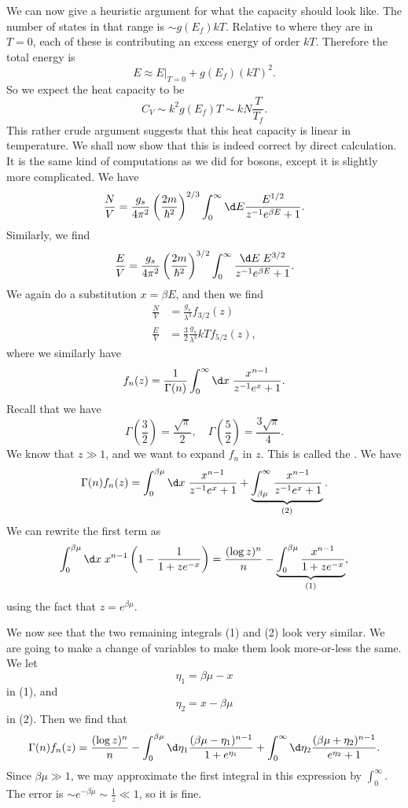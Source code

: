 \documentclass[a4paper]{article}
\begin{document}
We can now give a heuristic argument for what the capacity should look like. The number of states in that range is $\sim g(E_f) kT$. Relative to where they are in $T = 0$, each of these is contributing an excess energy of order $kT$. Therefore the total energy is
\[
  E \approx E|_{T = 0} + g(E_f) (kT)^2.
\]
So we expect the heat capacity to be
\[
  C_V \sim k^2 g(E_f) T \sim kN \frac{T}{T_f}.
\]
This rather crude argument suggests that this heat capacity is linear in temperature. We shall now show that this is indeed correct by direct calculation. It is the same kind of computations as we did for bosons, except it is slightly more complicated. We have
\[
  \frac{N}{V} = \frac{g_s}{4\pi^2}\left(\frac{2m}{\hbar^2}\right)^{2/3} \int_0^\infty \d E \frac{E^{1/2}}{z^{-1} e^{\beta E} + 1}.
\]
Similarly, we find
\[
  \frac{E}{V} = \frac{g_s}{4\pi^2} \left(\frac{2m}{\hbar^2}\right)^{3/2} \int_0^\infty \frac{\d E \; E^{3/2}}{z^{-1} e^{\beta E} + 1}.
\]
We again do a substitution $x = \beta E$, and then we find
\begin{align*}
  \frac{N}{V} &= \frac{g_s}{\lambda^3} f_{3/2}(z)\\
  \frac{E}{V} &= \frac{3}{2} \frac{g_s}{\lambda^3}kT f_{5/2}(z),
\end{align*}
where we similarly have
\[
  f_n(z) = \frac{1}{\Gamma(n)} \int_0^\infty \d x\; \frac{x^{n - 1}}{z^{-1}e^x + 1}.
\]
Recall that we have
\[
  \Gamma\left(\frac{3}{2}\right) = \frac{\sqrt{\pi}}{2},\quad \Gamma\left(\frac{5}{2}\right) = \frac{3\sqrt{\pi}}{4}.
\]
We know that $z \gg 1$, and we want to expand $f_n$ in $z$. This is called the . We have
\[
  \Gamma(n) f_n(z) = \int_0^{\beta\mu} \d x\; \frac{x^{n - 1}}{z^{-1}e^x + 1} + \underbrace{\int_{\beta\mu}^\infty \frac{x^{n - 1}}{z^{-1}e^x + 1}}_{(2)}.
\]
We can rewrite the first term as
\[
  \int_0^{\beta \mu} \d x\; x^{n - 1}\left(1 - \frac{1}{1 + z e^{-x}}\right) = \frac{(\log z)^n}{n} - \underbrace{\int_0^{\beta\mu} \frac{x^{n - 1}}{1 + z e^{-x}}}_{(1)},
\]
using the fact that $z = e^{\beta\mu}$.

We now see that the two remaining integrals (1) and (2) look very similar. We are going to make a change of variables to make them look more-or-less the same. We let
\[
  \eta_1 = \beta \mu - x
\]
in (1), and
\[
  \eta_2 = x - \beta \mu
\]
in (2). Then we find that
\[
  \Gamma(n) f_n(z) = \frac{(\log z)^n}{n} - \int_0^{\beta\mu} \d \eta_1 \frac{(\beta \mu - \eta_1)^{n - 1}}{1 + e^{\eta_1}} + \int_0^\infty \d \eta_2 \frac{(\beta \mu + \eta_2)^{n - 1}}{e^{\eta_2} + 1}.
\]
Since $\beta\mu \gg 1$, we may approximate the first integral in this expression by $\int_0^\infty$. The error is $\sim e^{-\beta\mu} \sim \frac{1}{z} \ll 1$, so it is fine.
\end{document}
